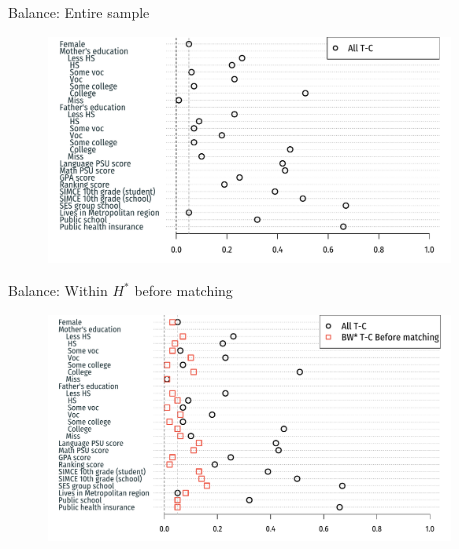 \documentclass[usenames,dvipsnames,11pt,aspectratio=169]{beamer}
\begin{document}
\begin{frame}{Balance: Entire sample}
\begin{figure}[!htb]
\centering
    \includegraphics[width=0.95\textwidth]{figures/loveplot1.pdf}
\end{figure}
\end{frame}

\begin{frame}{Balance: Within $H^*$ before matching}
\begin{figure}[!htb]
\centering
    \includegraphics[width=0.95\textwidth]{figures/loveplot2.pdf}
\end{figure}
\end{frame}
\end{document}
